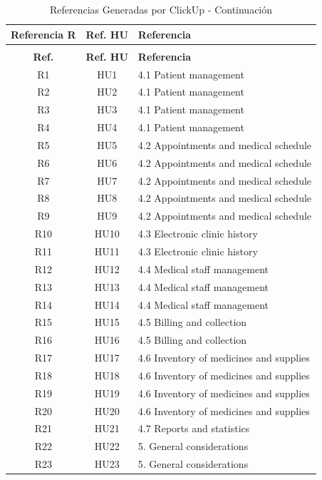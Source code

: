 \begin{longtable}{|c|c|p{9cm}|}
\caption{Referencias Generadas por ClickUp} 
\label{tab:referencias_clickup} \\
\hline
\textbf{Referencia R} & \textbf{Ref. HU} & \textbf{Referencia} \\
\hline
\endfirsthead
\caption{Referencias Generadas por ClickUp - Continuación} \\
\hline
\textbf{Ref.} & \textbf{Ref. HU} & \textbf{Referencia} \\
\hline
\endhead
\hline
\endfoot
\hline
\endlastfoot
R1 & HU1 & 4.1 Patient management \\
\hline
R2 & HU2 & 4.1 Patient management \\
\hline
R3 & HU3 & 4.1 Patient management \\
\hline
R4 & HU4 & 4.1 Patient management \\
\hline
R5 & HU5 & 4.2 Appointments and medical schedule \\
\hline
R6 & HU6 & 4.2 Appointments and medical schedule \\
\hline
R7 & HU7 & 4.2 Appointments and medical schedule \\
\hline
R8 & HU8 & 4.2 Appointments and medical schedule \\
\hline
R9 & HU9 & 4.2 Appointments and medical schedule \\
\hline
R10 & HU10 & 4.3 Electronic clinic history \\
\hline
R11 & HU11 & 4.3 Electronic clinic history \\
\hline
R12 & HU12 & 4.4 Medical staff management \\
\hline
R13 & HU13 & 4.4 Medical staff management \\
\hline
R14 & HU14 & 4.4 Medical staff management \\
\hline
R15 & HU15 & 4.5 Billing and collection \\
\hline
R16 & HU16 & 4.5 Billing and collection \\
\hline
R17 & HU17 & 4.6 Inventory of medicines and supplies \\
\hline
R18 & HU18 & 4.6 Inventory of medicines and supplies \\
\hline
R19 & HU19 & 4.6 Inventory of medicines and supplies \\
\hline
R20 & HU20 & 4.6 Inventory of medicines and supplies \\
\hline
R21 & HU21 & 4.7 Reports and statistics \\
\hline
R22 & HU22 & 5. General considerations \\
\hline
R23 & HU23 & 5. General considerations \\
\hline
\end{longtable}

